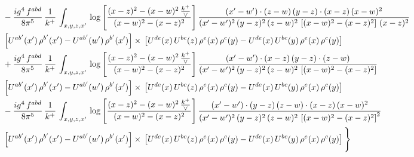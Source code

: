 \documentclass[9pt]{article}
\numberwithin{equation}{section}
\begin{document}
\begin{align}
& - \frac{ig^{4}\, f^{abd}}{8\pi^{5}}\, \frac{1}{k^{+}}\, \int_{x,y,z,x'}\,\log{\left[\frac{(x-z)^{2}-(x-w)^{2}\,\frac{k^{+}}{\vee}}{(x-w)^{2}-(x-z)^{2}}\right]}\,\frac{(x'-w')\cdot (z-w)\, (y-z)\cdot (x-z)\, (x-w)^{2}}{(x'-w')^{2}\, (y-z)^{2}\, (z-w)^{2}\,\left[(x-w)^{2} - (x-z)^{2}\right]\, (x-z)^{2}}\, \notag \\ & \left[U^{ab'}(x')\,\rho^{b'}(x')-U^{ab'}(w')\, \rho^{b'}(x')\right]\times\,\left[U^{de}(x)\,U^{bc}(z)\, \rho^{e}(x)\,\rho^{c}(y)-U^{de}(x)\,U^{bc}(y)\,\rho^{e}(x)\,\rho^{c}(y)\right] \notag \\
& +\frac{ig^{4}\, f^{abd}}{8\pi^{5}}\, \frac{1}{k^{+}}\, \int_{x,y,z,x'}\,\log{\left[\frac{(x-z)^{2}-(x-w)^{2}\,\frac{k^{+}}{\vee}}{(x-w)^{2}-(x-z)^{2}}\right]}\,\frac{(x'-w')\cdot (x-z)\, (y-z)\cdot (z-w)}{(x'-w')^{2}\, (y-z)^{2}\, (z-w)^{2}\,\left[(x-w)^{2} -(x-z)^{2}\right]}\, \notag \\ & \left[U^{ab'}(x')\,\rho^{b'}(x')-U^{ab'}(w')\, \rho^{b'}(x')\right]\times\,\left[U^{de}(x)\,U^{bc}(z)\, \rho^{e}(x)\,\rho^{c}(y)-U^{de}(x)\,U^{bc}(y)\,\rho^{e}(x)\,\rho^{c}(y)\right] \notag \\
& -\frac{ig^{4}\, f^{abd}}{8\pi^{5}}\, \frac{1}{k^{+}}\, \int_{x,y,z,x'}\,\log{\left[\frac{(x-z)^{2}-(x-w)^{2}\,\frac{k^{+}}{\vee}}{(x-w)^{2}-(x-z)^{2}}\right]}\,\frac{(x'-w')\cdot (y-z)\, (z-w)\cdot (x-z)\,(x-w)^{2}}{(x'-w')^{2}\, (y-z)^{2}\, (z-w)^{2}\,\left[(x-w)^{2}-(x-z)^{2}\right]^{2}}\, \notag \\ & \left[U^{ab'}(x')\,\rho^{b'}(x')-U^{ab'}(w')\, \rho^{b'}(x')\right]\times\,\left[U^{de}(x)\,U^{bc}(z)\, \rho^{e}(x)\,\rho^{c}(y)-U^{de}(x)\,U^{bc}(y)\,\rho^{e}(x)\,\rho^{c}(y)\right]\Bigg\}
\end{align}
\end{document}
